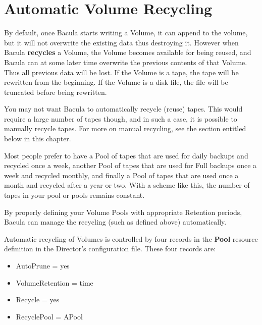 
\chapter{Automatic Volume Recycling}
\label{RecyclingChapter}

By default, once Bacula starts writing a Volume, it can append to the
volume, but it will not overwrite the existing data thus destroying it.
However when Bacula {\bf recycles} a Volume, the Volume becomes available
for being reused, and Bacula can at some later time overwrite the previous
contents of that Volume.  Thus all previous data will be lost.  If the
Volume is a tape, the tape will be rewritten from the beginning.  If the
Volume is a disk file, the file will be truncated before being rewritten.

You may not want Bacula to automatically recycle (reuse) tapes.  This would
require a large number of tapes though, and in such a case, it is possible
to manually recycle tapes.  For more on manual recycling, see the section
entitled  below in this
chapter.

Most people prefer to have a Pool of tapes that are used for daily backups and
recycled once a week, another Pool of tapes that are used for Full backups
once a week and recycled monthly, and finally a Pool of tapes that are used
once a month and recycled after a year or two. With a scheme like this, the 
number of tapes in your pool or pools remains constant.

By properly defining your Volume Pools with appropriate Retention periods,
Bacula can manage the recycling (such as defined above) automatically. 

Automatic recycling of Volumes is controlled by four records in the {\bf
Pool} resource definition in the Director's configuration file. These four
records are: 

\begin{itemize}
\item AutoPrune = yes 
\item VolumeRetention = \lt{}time\gt{} 
\item Recycle = yes
\item RecyclePool = \lt{}APool\gt{} %
\end{itemize}

